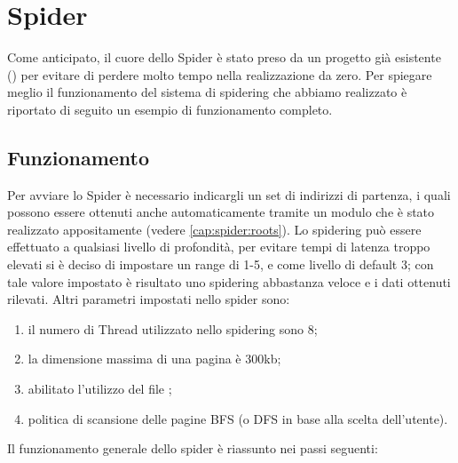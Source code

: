 \chapter{Spider}\label{cap:spider}
Come anticipato, il cuore dello Spider è stato preso da un progetto già esistente () per evitare di perdere molto tempo nella realizzazione da zero. Per spiegare meglio il funzionamento del sistema di spidering che abbiamo realizzato è riportato di seguito un esempio di funzionamento completo.
\section{Funzionamento}
Per avviare lo Spider è necessario indicargli un set di indirizzi di partenza, i quali possono essere ottenuti anche automaticamente tramite un modulo che è stato realizzato appositamente (vedere \ref{cap:spider:roots}). Lo spidering può essere effettuato a qualsiasi livello di profondità, per evitare tempi di latenza troppo elevati si è deciso di impostare un range di 1-5, e come livello di default 3; con tale valore impostato è risultato uno spidering abbastanza veloce e i dati ottenuti rilevati. Altri parametri impostati nello spider sono:
\begin{enumerate}
\item il numero di Thread utilizzato nello spidering sono 8;
\item la dimensione massima di una pagina è 300kb;
\item abilitato l'utilizzo del file ;
\item politica di scansione delle pagine BFS (o DFS in base alla scelta dell'utente).
\end{enumerate}
Il funzionamento generale dello spider è riassunto nei passi seguenti:
